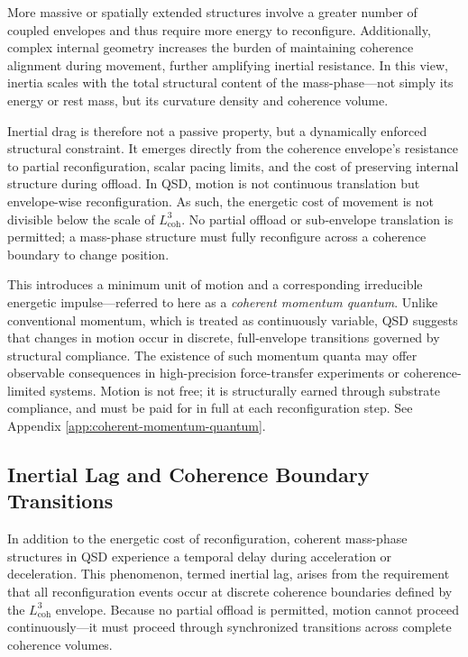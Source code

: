 \documentclass[entropy,article,submit,pdftex,oneauthor]{Definitions/mdpi}
\begin{document}
More massive or spatially extended structures involve a greater number of coupled envelopes and thus require more energy to reconfigure. Additionally, complex internal geometry increases the burden of maintaining coherence alignment during movement, further amplifying inertial resistance. In this view, inertia scales with the total structural content of the mass-phase—not simply its energy or rest mass, but its curvature density and coherence volume.

Inertial drag is therefore not a passive property, but a dynamically enforced structural constraint. It emerges directly from the coherence envelope’s resistance to partial reconfiguration, scalar pacing limits, and the cost of preserving internal structure during offload. In QSD, motion is not continuous translation but envelope-wise reconfiguration. As such, the energetic cost of movement is not divisible below the scale of \texorpdfstring{\( L_{\text{coh}}^3 \)}{Lcoh\^{}3}. No partial offload or sub-envelope translation is permitted; a mass-phase structure must fully reconfigure across a coherence boundary to change position.

This introduces a minimum unit of motion and a corresponding irreducible energetic impulse—referred to here as a \textit{coherent momentum quantum}. Unlike conventional momentum, which is treated as continuously variable, QSD suggests that changes in motion occur in discrete, full-envelope transitions governed by structural compliance. The existence of such momentum quanta may offer observable consequences in high-precision force-transfer experiments or coherence-limited systems. Motion is not free; it is structurally earned through substrate compliance, and must be paid for in full at each reconfiguration step.  See Appendix \ref{app:coherent-momentum-quantum}.

\subsection{Inertial Lag and Coherence Boundary Transitions}

In addition to the energetic cost of reconfiguration, coherent mass-phase structures in QSD experience a temporal delay during acceleration or deceleration. This phenomenon, termed inertial lag, arises from the requirement that all reconfiguration events occur at discrete coherence boundaries defined by the \texorpdfstring{\( L_{\text{coh}}^3 \)}{Lcoh\^{}3} envelope. Because no partial offload is permitted, motion cannot proceed continuously—it must proceed through synchronized transitions across complete coherence volumes.
\end{document}
